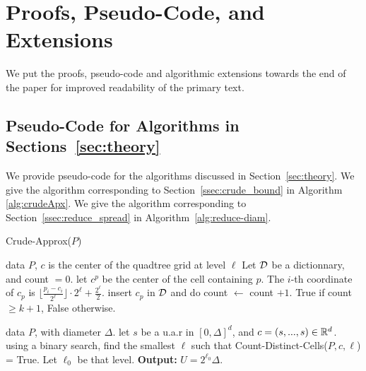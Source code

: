 \section{Proofs, Pseudo-Code, and Extensions}
We put the proofs, pseudo-code and algorithmic extensions towards the end of the paper for improved readability of the primary text.

\subsection{Pseudo-Code for Algorithms in Sections~\ref{sec:theory}}

We provide pseudo-code for the algorithms discussed in Section~\ref{sec:theory}. We give the algorithm corresponding to Section~\ref{ssec:crude_bound} in
Algorithm \ref{alg:crudeApx}. We give the algorithm corresponding to Section~\ref{ssec:reduce_spread} in Algorithm~\ref{alg:reduce-diam}.

\label{app:pseudoCode}
\begin{algorithm}[tb]
   \caption{Crude-Approx($P$)}
   \label{alg:crudeApx}
\begin{algorithmic}[1]
 \Comment data $P$, $c$ is the center of the quadtree grid at level $\ell$
   \State Let $\mathcal D$ be a dictionnary, and count $= 0$.
   \State let $c^p$ be the center of the cell containing $p$. The $i$-th coordinate of $c_p$ is $\lfloor \frac{p_i - c_i}{2^\ell}\rfloor  \cdot 2^\ell + \frac{2^{\ell}}{2}$. 
   \State insert $c_p$ in $\mathcal D$ and do count $\gets$ count $+1$.
   \EndIf
   \EndFor
    True if count $\geq k+1$, False otherwise.
   \EndProcedure
   
    \Comment data $P$, with diameter $\Delta$.
   \State let $s$ be a u.a.r in $[0, \Delta]^d$, and $c = (s,..., s) \in \mathbb{R}^d$.
   \State using a binary search, find the smallest $\ell$ such that Count-Distinct-Cells($P, c, \ell$) = True. Let $\ell_0$ be that level.
   \State \textbf{Output:} $U = 2^{\ell_0} \Delta$.
   \EndProcedure
\end{algorithmic}
\end{algorithm}

